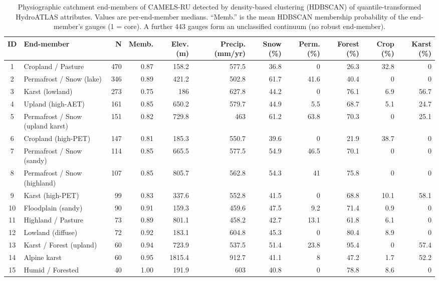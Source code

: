 \begin{table}[htbp]
\centering
\caption{Physiographic catchment end-members of CAMELS-RU detected by density-based clustering (HDBSCAN) of quantile-transformed HydroATLAS attributes. Values are per-end-member medians. ``Memb.'' is the mean HDBSCAN membership probability of the end-member's gauges (1 = core). A further 443 gauges form an unclassified continuum (no robust end-member).}
\label{tab:endmembers}
\small
\begin{tabular}{clrrrrrrrrr}
\toprule
ID & End-member & N & Memb. & Elev. (m) & Precip. (mm/yr) & Snow (\%) & Perm. (\%) & Forest (\%) & Crop (\%) & Karst (\%) \\
\midrule
1 & Cropland / Pasture & 470 & 0.87 & 158.2 & 577.5 & 36.8 & 0 & 26.3 & 32.8 & 0 \\
2 & Permafrost / Snow (lake) & 346 & 0.89 & 421.2 & 502.8 & 61.7 & 41.6 & 40.4 & 0 & 0 \\
3 & Karst (lowland) & 273 & 0.75 & 186 & 627.8 & 44.2 & 0 & 76.1 & 6.9 & 56.7 \\
4 & Upland (high-AET) & 161 & 0.85 & 650.2 & 579.7 & 44.9 & 5.5 & 68.7 & 5.1 & 24.7 \\
5 & Permafrost / Snow (upland karst) & 151 & 0.82 & 729.8 & 463 & 61.2 & 63.8 & 70.3 & 0 & 25.1 \\
6 & Cropland (high-PET) & 147 & 0.81 & 185.3 & 550.7 & 39.6 & 0 & 21.9 & 38.7 & 0 \\
7 & Permafrost / Snow (sandy) & 114 & 0.85 & 665.5 & 577.5 & 54.9 & 46.5 & 70.1 & 0 & 0 \\
8 & Permafrost / Snow (highland) & 107 & 0.85 & 805.7 & 562.8 & 54.3 & 41 & 75.8 & 0 & 0 \\
9 & Karst (high-PET) & 99 & 0.83 & 337.6 & 552.8 & 41.5 & 0 & 68.8 & 10.1 & 58.1 \\
10 & Floodplain (sandy) & 90 & 0.91 & 159.3 & 459.6 & 47.5 & 9.2 & 71.4 & 0.9 & 0 \\
11 & Highland / Pasture & 73 & 0.89 & 801.1 & 458.2 & 42.7 & 13.1 & 61.8 & 6.1 & 0 \\
12 & Lowland (diffuse) & 72 & 0.92 & 183.1 & 604.8 & 45.3 & 0 & 80.4 & 8.9 & 0 \\
13 & Karst / Forest (upland) & 60 & 0.94 & 723.9 & 537.5 & 51.4 & 23.8 & 95.4 & 0 & 57.4 \\
14 & Alpine karst & 60 & 0.95 & 1815.4 & 912.7 & 41.1 & 8 & 47.2 & 1.7 & 52.2 \\
15 & Humid / Forested & 40 & 1.00 & 191.9 & 603 & 40.8 & 0 & 78.8 & 8.6 & 0 \\

\end{tabular}
\end{table}
